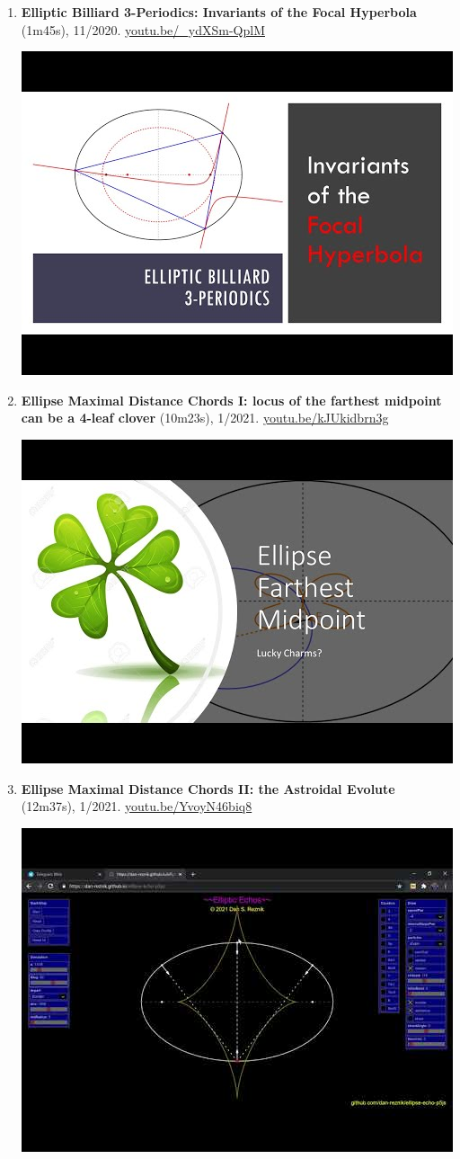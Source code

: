 \documentclass[12pt]{article}
\begin{document}
\begin{enumerate}[resume]
% 
\item \textbf{Elliptic Billiard 3-Periodics: Invariants of the Focal Hyperbola} (1m45s), 11/2020. \href{https://youtu.be/_ydXSm-QplM}{\url{youtu.be/\_ydXSm-QplM}}
\begin{center}\includegraphics[width=.5\textwidth]{pics/_ydXSm-QplM.jpg}\end{center}
% 
\item \textbf{Ellipse Maximal Distance Chords I: locus of the farthest midpoint can be a 4-leaf clover} (10m23s), 1/2021. \href{https://youtu.be/kJUkidbrn3g}{\url{youtu.be/kJUkidbrn3g}}
\begin{center}\includegraphics[width=.5\textwidth]{pics/kJUkidbrn3g.jpg}\end{center}
% 
\item \textbf{Ellipse Maximal Distance Chords II: the Astroidal Evolute} (12m37s), 1/2021. \href{https://youtu.be/YvoyN46biq8}{\url{youtu.be/YvoyN46biq8}}
\begin{center}\includegraphics[width=.5\textwidth]{pics/YvoyN46biq8.jpg}\end{center}

\end{enumerate}
\end{document}
